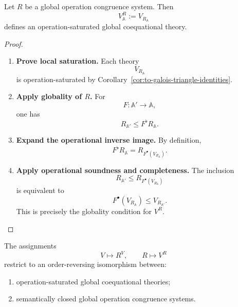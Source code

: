 \begin{proposition}
\label{prop:to-global-R-to-V}
    Let \(R\) be a global operation congruence system. Then
    \[
        V^R_{\mathbb A}
        :=
        V_{R_{\mathbb A}}
    \]
    defines an operation-saturated global coequational theory.
\end{proposition}

\begin{proof}
    \leavevmode
    \begin{enumerate}
        \item \textbf{Prove local saturation.}
        Each theory
        \[
            V_{R_{\mathbb A}}
        \]
        is operation-saturated by
        Corollary~\ref{cor:to-galois-triangle-identities}.

        \item \textbf{Apply globality of \(R\).}
        For
        \[
            F:\mathbb A'\to\mathbb A,
        \]
        one has
        \[
            R_{\mathbb A'}
            \leq
            F^\flat R_{\mathbb A}.
        \]

        \item \textbf{Expand the operational inverse image.}
        By definition,
        \[
            F^\flat R_{\mathbb A}
            =
            R_{F^\bullet(V_{R_{\mathbb A}})}.
        \]

        \item \textbf{Apply operational soundness and completeness.}
        The inclusion
        \[
            R_{\mathbb A'}
            \leq
            R_{F^\bullet(V_{R_{\mathbb A}})}
        \]
        is equivalent to
        \[
            F^\bullet(V_{R_{\mathbb A}})
            \leq
            V_{R_{\mathbb A'}}.
        \]
        This is precisely the globality condition for \(V^R\).
    \end{enumerate}
\end{proof}

\begin{theorem}
\label{thm:to-global-algebraic-eilenberg}
    The assignments
    \[
        V
        \longmapsto
        R^V,
        \qquad
        R
        \longmapsto
        V^R
    \]
    restrict to an order-reversing isomorphism between:
    \begin{enumerate}
        \item operation-saturated global coequational theories;
        \item semantically closed global operation congruence systems.
    \end{enumerate}
\end{theorem}

